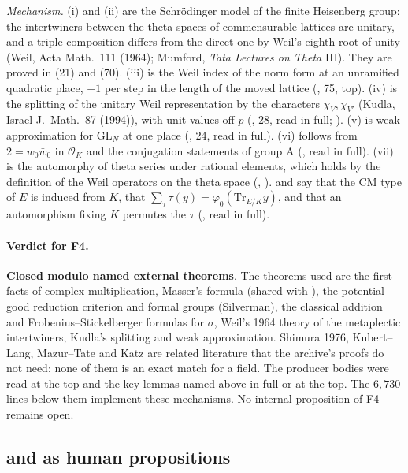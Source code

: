 \documentclass[11pt]{article}
\newcommand{\sE}{\textbf{Closed modulo named external theorems}}
\theoremstyle{remark}
\begin{document}
\noindent\emph{Mechanism.} (i) and (ii) are the Schr\"odinger model of the finite Heisenberg group: the intertwiners between the theta spaces of commensurable lattices are unitary, and a triple composition differs from the direct one by Weil's eighth root of unity (Weil, Acta Math.\ 111 (1964); Mumford, \emph{Tata Lectures on Theta} III). They are proved in  (21) and  (70). (iii) is the Weil index of the norm form at an unramified quadratic place, $-1$ per step in the length of the moved lattice (, 75, top). (iv) is the splitting of the unitary Weil representation by the characters $\chi_V,\chi_{V'}$ (Kudla, Israel J.\ Math.\ 87 (1994)), with unit values off $p$ (, 28, read in full; ). (v) is weak approximation for $\mathrm{GL}_N$ at one place (, 24, read in full). (vi) follows from $2=w_0\bar w_0$ in $\mathcal O_K$ and the conjugation statements of group A (, read in full). (vii) is the automorphy of theta series under rational elements, which holds by the definition of the Weil operators on the theta space (, ).  and  say that the CM type of $E$ is induced from $K$, that $\sum_\tau\tau(y)=\varphi_0(\mathrm{Tr}_{E/K}y)$, and that an automorphism fixing $K$ permutes the $\tau$ (, read in full).

\paragraph{Verdict for F4.} \sE. The theorems used are the first facts of complex multiplication, Masser's formula (shared with ), the potential good reduction criterion and formal groups (Silverman), the classical addition and Frobenius--Stickelberger formulas for $\sigma$, Weil's 1964 theory of the metaplectic intertwiners, Kudla's splitting and weak approximation. Shimura 1976, Kubert--Lang, Mazur--Tate and Katz are related literature that the archive's proofs do not need; none of them is an exact match for a field. The producer bodies were read at the top and the key lemmas named above in full or at the top. The $6{,}730$ lines below them implement these mechanisms. No internal proposition of F4 remains open.

\subsection{ and  as human propositions}\label{sec:fu3open}
\end{document}
